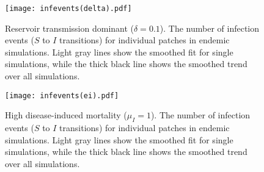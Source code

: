 \documentclass{svjour3}
\begin{document}
\begin{figure}
\centering
\texttt{[image: infevents(delta).pdf]}
\caption{Reservoir transmission dominant ($\delta = 0.1$).  The number of infection events ($S$ to $I$ transitions) for individual patches in endemic simulations.  Light gray lines show the smoothed fit for single simulations, while the thick black line shows the smoothed trend over all simulations.}
\label{infections_delta}
\end{figure}

\begin{figure}
\centering
\texttt{[image: infevents(ei).pdf]}
\caption{High disease-induced mortality ($\mu_I = 1$).  The number of infection events ($S$ to $I$ transitions) for individual patches in endemic simulations.  Light gray lines show the smoothed fit for single simulations, while the thick black line shows the smoothed trend over all simulations.}
\label{infections_ei}
\end{figure}


\clearpage

     
\end{document}
